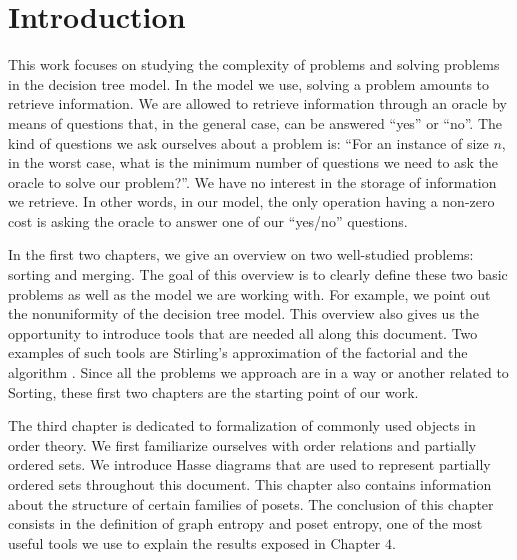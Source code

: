 \chapter*{Introduction}
%

This work focuses on studying the complexity of problems and solving problems
in the decision tree model. In the model we use, solving a problem
amounts to retrieve information. We are allowed to retrieve information
through an oracle by means of questions that, in the general case,
can be answered ``yes'' or ``no''. The kind of questions we ask ourselves
about a problem is: ``For an instance of size \(n\), in the worst case, what is
the minimum number of questions we need to ask the oracle to solve our
problem?''. We have no interest in the storage of information we retrieve.
In other words, in our model, the only operation having a non-zero cost is
asking the oracle to answer one of our ``yes/no'' questions.

In the first two chapters, we give an overview on two well-studied problems:
sorting and merging. The goal of this overview is to clearly define these two
basic problems as well as the model we are working with. For example, we point
out the nonuniformity of the decision tree model. This overview also gives us
the opportunity to introduce tools that are needed all along this document. Two
examples of such tools are Stirling's approximation of the factorial
\cite{feller1967direct} and the \mergesort algorithm
\cite{goldstine:1948,leiserson:2001}. Since all the problems we approach are in
a way or another related to Sorting, these first two chapters are the starting
point of our work.

The third chapter is dedicated to formalization of commonly used objects
in order theory. We first familiarize ourselves with order
relations and partially ordered sets. We introduce Hasse diagrams that
are used to represent partially ordered sets throughout this document.
This chapter also contains information about the structure of
certain families of posets. The conclusion of this
chapter consists in the definition of graph entropy \cite{korner1973coding}
and poset entropy, one of the most useful tools we use to explain the
results exposed in Chapter \(4\).

